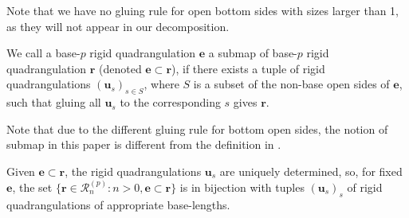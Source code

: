 \documentclass[11pt]{article}
\theoremstyle{plain}
\theoremstyle{definition}
\begin{document}
Note that we have no gluing rule for open bottom sides with sizes larger than 1, as they will not appear in our decomposition.

We call a base-$p$ rigid quadrangulation $\mathbf{e}$ a submap of base-$p$ rigid quadrangulation $\mathbf{r}$ (denoted $\mathbf{e}\subset\mathbf{r}$), if there exists a tuple of rigid quadrangulations $(\mathbf{u}_s)_{s\in S}$, where $S$ is a subset of the non-base open sides of $\mathbf{e}$, such that gluing all $\mathbf{u}_s$ to the corresponding $s$ gives $\mathbf{r}$.

Note that due to the different gluing rule for bottom open sides, the notion of submap in this paper is different from the definition in \cite{Budd_rectilinear_2025}.

Given $\mathbf{e}\subset\mathbf{r}$, the rigid quadrangulations $\mathbf{u}_s$ are uniquely determined, so, for fixed $\mathbf{e}$, the set $\{ \mathbf{r}\in\mathcal{R}_n^{(p)} : n>0 , \mathbf{e}\subset \mathbf{r}\}$ is in bijection with tuples $(\mathbf{u}_s)_s$ of rigid quadrangulations of appropriate base-lengths.
\end{document}

